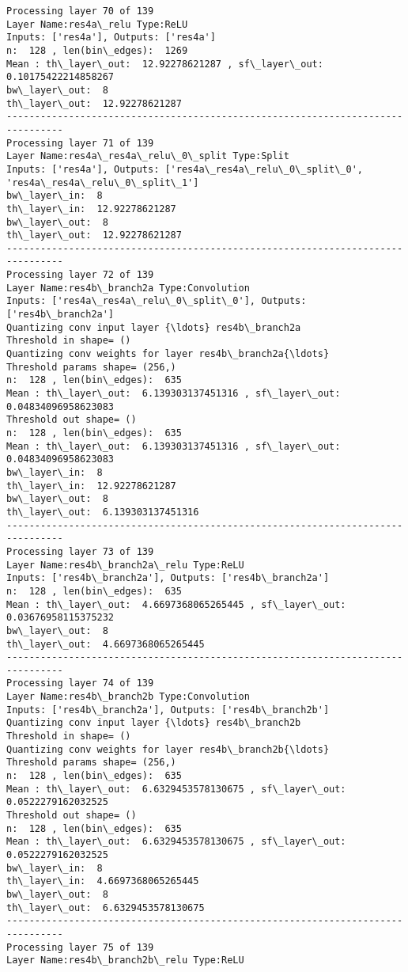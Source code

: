 \documentclass[11pt]{article}
\begin{document}
\begin{Verbatim}[commandchars=\\\{\}]
Processing layer 70 of 139
Layer Name:res4a\_relu Type:ReLU
Inputs: ['res4a'], Outputs: ['res4a']
n:  128 , len(bin\_edges):  1269
Mean : th\_layer\_out:  12.92278621287 , sf\_layer\_out:  0.10175422214858267
bw\_layer\_out:  8
th\_layer\_out:  12.92278621287
--------------------------------------------------------------------------------
Processing layer 71 of 139
Layer Name:res4a\_res4a\_relu\_0\_split Type:Split
Inputs: ['res4a'], Outputs: ['res4a\_res4a\_relu\_0\_split\_0', 'res4a\_res4a\_relu\_0\_split\_1']
bw\_layer\_in:  8
th\_layer\_in:  12.92278621287
bw\_layer\_out:  8
th\_layer\_out:  12.92278621287
--------------------------------------------------------------------------------
Processing layer 72 of 139
Layer Name:res4b\_branch2a Type:Convolution
Inputs: ['res4a\_res4a\_relu\_0\_split\_0'], Outputs: ['res4b\_branch2a']
Quantizing conv input layer {\ldots} res4b\_branch2a
Threshold in shape= ()
Quantizing conv weights for layer res4b\_branch2a{\ldots}
Threshold params shape= (256,)
n:  128 , len(bin\_edges):  635
Mean : th\_layer\_out:  6.139303137451316 , sf\_layer\_out:  0.04834096958623083
Threshold out shape= ()
n:  128 , len(bin\_edges):  635
Mean : th\_layer\_out:  6.139303137451316 , sf\_layer\_out:  0.04834096958623083
bw\_layer\_in:  8
th\_layer\_in:  12.92278621287
bw\_layer\_out:  8
th\_layer\_out:  6.139303137451316
--------------------------------------------------------------------------------
Processing layer 73 of 139
Layer Name:res4b\_branch2a\_relu Type:ReLU
Inputs: ['res4b\_branch2a'], Outputs: ['res4b\_branch2a']
n:  128 , len(bin\_edges):  635
Mean : th\_layer\_out:  4.6697368065265445 , sf\_layer\_out:  0.03676958115375232
bw\_layer\_out:  8
th\_layer\_out:  4.6697368065265445
--------------------------------------------------------------------------------
Processing layer 74 of 139
Layer Name:res4b\_branch2b Type:Convolution
Inputs: ['res4b\_branch2a'], Outputs: ['res4b\_branch2b']
Quantizing conv input layer {\ldots} res4b\_branch2b
Threshold in shape= ()
Quantizing conv weights for layer res4b\_branch2b{\ldots}
Threshold params shape= (256,)
n:  128 , len(bin\_edges):  635
Mean : th\_layer\_out:  6.6329453578130675 , sf\_layer\_out:  0.0522279162032525
Threshold out shape= ()
n:  128 , len(bin\_edges):  635
Mean : th\_layer\_out:  6.6329453578130675 , sf\_layer\_out:  0.0522279162032525
bw\_layer\_in:  8
th\_layer\_in:  4.6697368065265445
bw\_layer\_out:  8
th\_layer\_out:  6.6329453578130675
--------------------------------------------------------------------------------
Processing layer 75 of 139
Layer Name:res4b\_branch2b\_relu Type:ReLU

\end{Verbatim}
\end{document}
